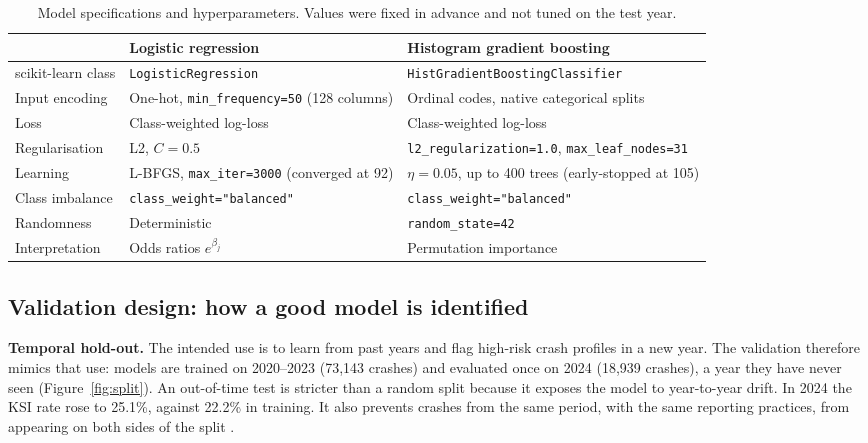 \documentclass[11pt,a4paper]{article}
\begin{document}
\begin{table}[H]
\centering
\caption{Model specifications and hyperparameters. Values were fixed in advance and not tuned on the test year.}
\label{tab:hyper}
\footnotesize
\begin{tabularx}{\textwidth}{@{}P{3.4cm}LL@{}}
\toprule
 & \textbf{Logistic regression} & \textbf{Histogram gradient boosting} \\
\midrule
scikit-learn class & \texttt{LogisticRegression} & \texttt{HistGradientBoostingClassifier} \\
Input encoding & One-hot, \texttt{min\_frequency=50} (128 columns) & Ordinal codes, native categorical splits \\
Loss & Class-weighted log-loss & Class-weighted log-loss \\
Regularisation & L2, $C = 0.5$ & \texttt{l2\_regularization=1.0}, \texttt{max\_leaf\_nodes=31} \\
Learning & L-BFGS, \texttt{max\_iter=3000} (converged at 92) & $\eta = 0.05$, up to 400 trees (early-stopped at 105) \\
Class imbalance & \texttt{class\_weight="balanced"} & \texttt{class\_weight="balanced"} \\
Randomness & Deterministic & \texttt{random\_state=42} \\
Interpretation & Odds ratios $e^{\beta_j}$ & Permutation importance \\
\bottomrule
\end{tabularx}
\end{table}

\subsection{Validation design: how a good model is identified}
\label{sec:validation}

\textbf{Temporal hold-out.} The intended use is to learn from past years and flag high-risk crash profiles in a
new year. The validation therefore mimics that use: models are trained on 2020--2023 (73,143 crashes) and
evaluated once on 2024 (18,939 crashes), a year they have never seen (Figure~\ref{fig:split}). An out-of-time test is
stricter than a random split because it exposes the model to year-to-year drift. In 2024 the KSI rate rose to
25.1\%, against 22.2\% in training. It also prevents crashes from the same period, with the same reporting
practices, from appearing on both sides of the split \parencite{tashman2000}.
\end{document}
